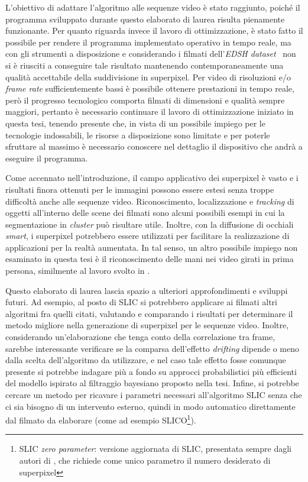 \documentclass[12pt,a4paper,oneside]{article}
\begin{document}
L'obiettivo di adattare l'algoritmo \cite{ACHANTA_SLIC} alle sequenze video è stato raggiunto, poiché il programma sviluppato durante questo elaborato di laurea risulta pienamente funzionante. Per quanto riguarda invece il lavoro di ottimizzazione, è stato fatto il possibile per rendere il programma implementato operativo in tempo reale, ma con gli strumenti a disposizione e considerando i filmati dell'\textit{EDSH dataset}~\cite{KITANI_HAND_DETECTION} non si è riusciti a conseguire tale risultato mantenendo contemporaneamente una qualità accettabile della suddivisione in superpixel. Per video di risoluzioni e/o \textit{frame rate} sufficientemente bassi è possibile ottenere prestazioni in tempo reale, però il progresso tecnologico comporta filmati di dimensioni e qualità sempre maggiori, pertanto è necessario continuare il lavoro di ottimizzazione iniziato in questa tesi, tenendo presente che, in vista di un possibile impiego per le tecnologie indossabili, le risorse a disposizione sono limitate e per poterle sfruttare al massimo è necessario conoscere nel dettaglio il dispositivo che andrà a eseguire il programma. 

Come accennato nell'introduzione, il campo applicativo dei superpixel è vasto e i risultati finora ottenuti per le immagini possono essere estesi senza troppe difficoltà anche alle sequenze video. Riconoscimento, localizzazione e \textit{tracking} di oggetti all'interno delle scene dei filmati sono alcuni possibili esempi in cui la segmentazione in \textit{cluster} può risultare utile. Inoltre, con la diffusione di occhiali \textit{smart}, i superpixel potrebbero essere utilizzati per facilitare la realizzazione di applicazioni per la realtà aumentata. In tal senso, un altro possibile impiego non esaminato in questa tesi è il riconoscimento delle mani nei video girati in prima persona, similmente al lavoro svolto in \cite{SERRA_HAND_RECOGNITION}.

\noindent Questo elaborato di laurea lascia spazio a ulteriori approfondimenti e sviluppi futuri. Ad esempio, al posto di \gls{SLIC} si potrebbero applicare ai filmati altri algoritmi fra quelli citati, valutando e comparando i risultati per determinare il metodo migliore nella generazione di superpixel per le sequenze video. Inoltre, considerando un'elaborazione che tenga conto della correlazione tra frame, sarebbe interessante verificare se la comparsa dell'effetto \textit{drifting} dipende o meno dalla scelta dell'algoritmo da utilizzare, e nel caso tale effetto fosse comunque presente si potrebbe indagare più a fondo su approcci probabilistici più efficienti del modello ispirato al filtraggio bayesiano proposto nella tesi. Infine, si potrebbe cercare un metodo per ricavare i parametri necessari all'algoritmo \gls{SLIC} senza che ci sia bisogno di un intervento esterno, quindi in modo automatico direttamente dal filmato da elaborare (come ad esempio SLICO\footnote{SLIC \textit{zero parameter}: versione aggiornata di \gls{SLIC}, presentata sempre dagli autori di \cite{ACHANTA_SLIC}, che richiede come unico parametro il numero desiderato di superpixel}).





\newpage
\cleardoublepage
{}
{}

\end{document}
